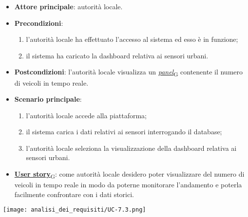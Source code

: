 \begin{itemize}
	\item \textbf{Attore principale}: autorità locale.
	\item \textbf{Precondizioni}:
	      \begin{enumerate}
		      \item l'autorità locale ha effettuato l'accesso al sistema ed esso è in funzione;
		      \item il sistema ha caricato la dashboard relativa ai sensori urbani.
	      \end{enumerate}
	\item \textbf{Postcondizioni}: l'autorità locale visualizza un \href{https://7last.github.io/docs/pb/documentazione-interna/glossario\#panel}{\textit{panel}\textsubscript{G}} contenente il numero di veicoli in tempo reale.
	\item \textbf{Scenario principale}:
	      \begin{enumerate}
		      \item l'autorità locale accede alla piattaforma;
		      \item il sistema carica i dati relativi ai sensori interrogando il database;
		      \item l'autorità locale seleziona la visualizzazione della dashboard relativa ai sensori urbani.
	      \end{enumerate}
	\item \href{https://7last.github.io/docs/pb/documentazione-interna/glossario\#user-story}{\textbf{User story}\textsubscript{G}}:
	      come autorità locale desidero poter visualizzare del numero di veicoli in tempo reale in modo da poterne monitorare l'andamento
	      e poterla facilmente confrontare con i dati storici.
\end{itemize}
\begin{center}
	\texttt{[image: analisi\_dei\_requisiti/UC-7.3.png]}
\end{center}


